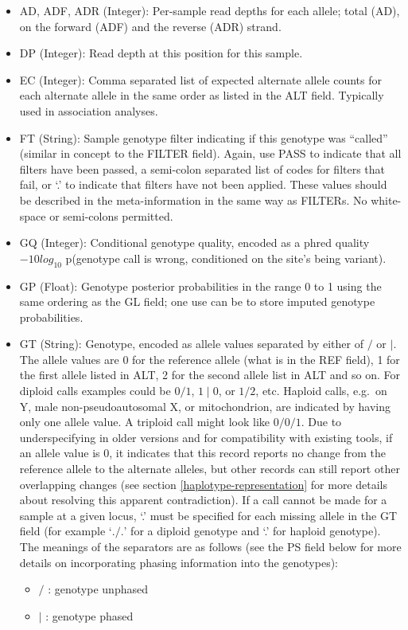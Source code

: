 \documentclass[8pt]{article}
\begin{document}
\begin{itemize}
\renewcommand{\labelitemii}{$\circ$}
  \item AD, ADF, ADR (Integer): Per-sample read depths for each allele; total (AD), on the forward (ADF) and the reverse (ADR) strand.
  \item DP (Integer): Read depth at this position for this sample.
  \item EC (Integer): Comma separated list of expected alternate allele counts for each alternate allele in the same order as listed in the ALT field.
  Typically used in association analyses.
  \item FT (String): Sample genotype filter indicating if this genotype was ``called'' (similar in concept to the FILTER field).
  Again, use PASS to indicate that all filters have been passed, a semi-colon separated list of codes for filters that fail, or `.' to indicate that filters have not been applied.
  These values should be described in the meta-information in the same way as FILTERs.
  No white-space or semi-colons permitted.
  \item GQ (Integer): Conditional genotype quality, encoded as a phred quality $-10log_{10}$ p(genotype call is wrong, conditioned on the site's being variant).
  \item GP (Float): Genotype posterior probabilities in the range 0 to 1 using the same ordering as the GL field; one use can be to store imputed genotype probabilities.
  \item GT (String): Genotype, encoded as allele values separated by either of $/$ or $\mid$.
  The allele values are 0 for the reference allele (what is in the REF field), 1 for the first allele listed in ALT, 2 for the second allele list in ALT and so on.
  For diploid calls examples could be $0/1$, $1\mid0$, or $1/2$, etc.
  Haploid calls, e.g.\ on Y, male non-pseudoautosomal X, or mitochondrion, are indicated by having only one allele value.
  A triploid call might look like $0/0/1$.
  Due to underspecifying in older versions and for compatibility with existing tools, if an allele value is 0, it indicates that this record reports no change from the reference allele to the alternate alleles, but other records can still report other overlapping changes (see section \ref{haplotype-representation} for more details about resolving this apparent contradiction).
  If a call cannot be made for a sample at a given locus, `.' must be specified for each missing allele in the GT field (for example `$./.$' for a diploid genotype and `.' for haploid genotype).
  The meanings of the separators are as follows (see the PS field below for more details on incorporating phasing information into the genotypes):
	\begin{itemize}
	  \item $/$ : genotype unphased
	  \item $\mid$ : genotype phased
	\end{itemize}


\end{itemize}
\end{document}
